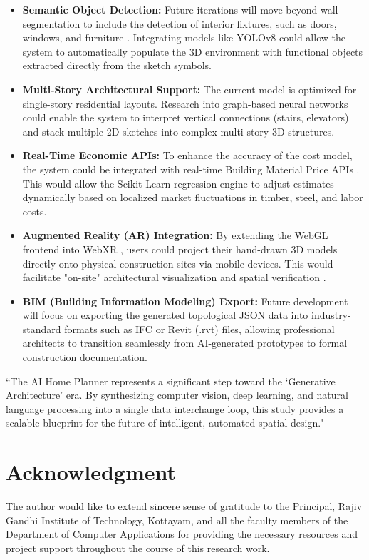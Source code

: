 \documentclass[10pt, conference, a4paper]{IEEEtran}
\begin{document}
\begin{itemize}
    \item \textbf{Semantic Object Detection:} Future iterations will move beyond wall segmentation to include the detection of interior fixtures, such as doors, windows, and furniture . Integrating models like YOLOv8 could allow the system to automatically populate the 3D environment with functional objects extracted directly from the sketch symbols.
    \item \textbf{Multi-Story Architectural Support:} The current model is optimized for single-story residential layouts. Research into graph-based neural networks could enable the system to interpret vertical connections (stairs, elevators) and stack multiple 2D sketches into complex multi-story 3D structures.
    \item \textbf{Real-Time Economic APIs:} To enhance the accuracy of the cost model, the system could be integrated with real-time Building Material Price APIs . This would allow the Scikit-Learn regression engine to adjust estimates dynamically based on localized market fluctuations in timber, steel, and labor costs.
    \item \textbf{Augmented Reality (AR) Integration:} By extending the WebGL frontend into WebXR , users could project their hand-drawn 3D models directly onto physical construction sites via mobile devices. This would facilitate "on-site" architectural visualization and spatial verification .
    \item \textbf{BIM (Building Information Modeling) Export:} Future development will focus on exporting the generated topological JSON data into industry-standard formats such as IFC or Revit (.rvt) files, allowing professional architects to transition seamlessly from AI-generated prototypes to formal construction documentation.
\end{itemize}

``The AI Home Planner represents a significant step toward the `Generative Architecture' era. By synthesizing computer vision, deep learning, and natural language processing into a single data interchange loop, this study provides a scalable blueprint for the future of intelligent, automated spatial design."

\vspace{10pt}
\section*{Acknowledgment}
The author would like to extend sincere sense of gratitude to the Principal, Rajiv Gandhi Institute of Technology, Kottayam, and all the faculty members of the Department of Computer Applications for providing the necessary resources and project support throughout the course of this research work.
\end{document}
